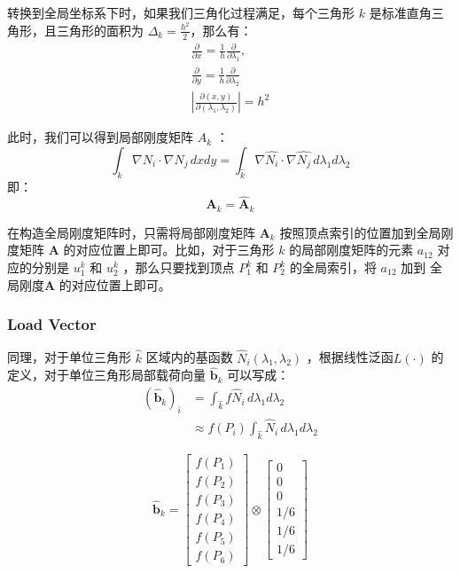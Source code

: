 \documentclass[11pt]{ctexart}
\begin{document}
转换到全局坐标系下时，如果我们三角化过程满足，每个三角形 $ k $ 是标准直角三角形，且三角形的面积为 $ \Delta_k = \frac{h^2}{2} $，那么有：
\begin{gather*}
    \frac{\partial}{\partial x} = \frac{1}{h}\frac{\partial}{\partial \lambda_1},\\  
    \frac{\partial}{\partial y} = \frac{1}{h}\frac{\partial}{\partial \lambda_2}\\
    \left|\frac{\partial(x,y)}{\partial(\lambda_1,\lambda_2)}\right|= h^2
\end{gather*}

此时，我们可以得到局部刚度矩阵 $ A_k $ ：
\begin{equation}
  \int_k \nabla N_i \cdot \nabla N_j \, dx dy =\int_{\hat{k}} \nabla \hat{N_i} \cdot \nabla \hat{N_j} \, d\lambda_1 d\lambda_2
\end{equation}
即：
\begin{equation}
  \mathbf{A}_k = \hat{\mathbf{A}}_k
\end{equation}

在构造全局刚度矩阵时，只需将局部刚度矩阵 $ \mathbf{A}_k $ 按照顶点索引的位置加到全局刚度矩阵 $ \mathbf{A} $ 的对应位置上即可。比如，对于三角形 $ k $ 的局部刚度矩阵的元素 $ a_{12} $ 对应的分别是 $ u_1^k $ 和 $ u_2^k $ ，那么只要找到顶点 $ P_1^k $ 和 $ P_2^k $ 的全局索引，将 $ a_{12} $ 加到 全局刚度$ \mathbf{A} $ 的对应位置上即可。

\subsubsection{Load Vector}
同理，对于单位三角形 $ \hat{k} $ 区域内的基函数 $ \hat{N}_i(\lambda_1,\lambda_2) $ ，根据线性泛函$ L(\cdot) $ 的定义，对于单位三角形局部载荷向量 $ \hat{\mathbf{b}}_k $ 可以写成：
\begin{equation}
  \begin{aligned}
    (\hat{\mathbf{b}}_k)_i &= \int_{\hat{k}} f \hat{N}_i \, d\lambda_1 d\lambda_2\\
    &\approx f(P_i) \int_{\hat{k}} \hat{N}_i \, d\lambda_1 d\lambda_2
  \end{aligned}
\end{equation}

\begin{equation}
  \hat{\mathbf{b}}_k = \begin{bmatrix}
    f(P_1)\\
    f(P_2)\\
    f(P_3)\\
    f(P_4)\\
    f(P_5)\\
    f(P_6)
  \end{bmatrix}\otimes
  \begin{bmatrix}
    0\\
    0\\
    0\\
    1/6\\
    1/6\\
    1/6
  \end{bmatrix}
\end{equation}
\end{document}
